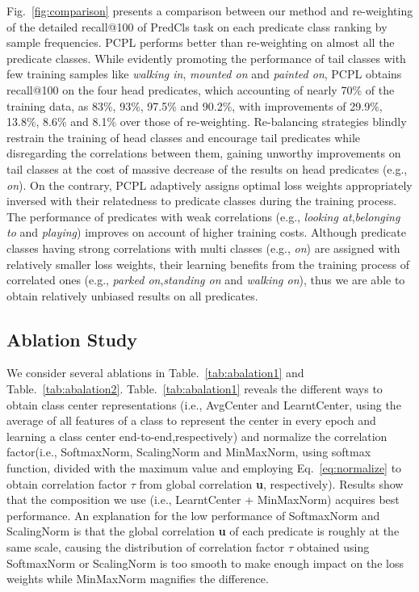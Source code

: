 \documentclass[sigconf]{acmart}
\begin{document}
Fig.~\ref{fig:comparison} presents a comparison between our method and re-weighting of the detailed recall@100 of PredCls task on each predicate class ranking by sample frequencies. PCPL performs better than re-weighting on almost all the predicate classes. While evidently promoting the performance of tail classes with few training samples like \emph{walking in}, \emph{mounted on} and \emph{painted on}, PCPL obtains recall@100 on the four head predicates, which accounting of nearly 70\% of the training data, as 83\%, 93\%, 97.5\% and 90.2\%, with improvements of 29.9\%, 13.8\%, 8.6\% and 8.1\% over those of re-weighting. Re-balancing strategies blindly restrain the training of head classes and encourage tail predicates while disregarding the correlations between them, gaining unworthy improvements on tail classes at the cost of massive decrease of the results on head predicates (e.g., \emph{on}). On the contrary, PCPL adaptively assigns optimal loss weights appropriately inversed with their relatedness to predicate classes during the training process. The performance of predicates with weak correlations (e.g., \emph{looking at},\emph{belonging to} and \emph{playing}) improves on account of higher training costs. Although predicate classes having strong correlations with multi classes (e.g., \emph{on}) are assigned with relatively smaller loss weights, their learning benefits from the training process of correlated ones (e.g., \emph{parked on},\emph{standing on} and \emph{walking on}), thus we are able to obtain relatively unbiased results on all predicates. 
\subsection{Ablation Study}
We consider several ablations in Table.~\ref{tab:abalation1} and Table.~\ref{tab:abalation2}. Table.~\ref{tab:abalation1} reveals the different ways to obtain class center representations (i.e., AvgCenter and LearntCenter, using the average of all features of a class to represent the center in every epoch and learning a class center end-to-end,respectively) and normalize the correlation factor(i.e., SoftmaxNorm, ScalingNorm and MinMaxNorm, using softmax function, divided with the maximum value and employing Eq.~\ref{eq:normalize} to obtain correlation factor $\tau$ from global correlation \textbf{u}, respectively). Results show that the composition we use (i.e., LearntCenter + MinMaxNorm) acquires best performance. An explanation for the low performance of SoftmaxNorm and ScalingNorm is that the global correlation \textbf{u} of each predicate is roughly at the same scale, causing the distribution of correlation factor $\tau$ obtained using SoftmaxNorm or ScalingNorm is too smooth to make enough impact on the loss weights while MinMaxNorm magnifies the difference.
\end{document}
